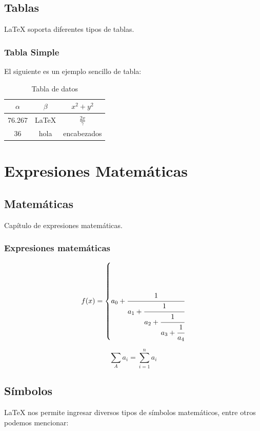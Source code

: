 \documentclass[letterpaper,12pt,twoside]{book}
\begin{document}
\chapter{Tablas}

\LaTeX{} soporta diferentes tipos de tablas.

\section{Tabla Simple}

El siguiente es un ejemplo sencillo de tabla:

\begin{table}[h!]
	\centering
	\begin{tabular}{|c|c|c|}
		\hline 
		$\alpha$ & $\beta$ & $x^2+y^2$ \\ 
		\hline 
		76.267 & \LaTeX & $\frac{2x}{\gamma}$ \\ 
		\hline 
		36 & hola & encabezados \\ 
		\hline 
	\end{tabular} 
	\caption{Tabla de datos}
\end{table}

\part{Expresiones Matemáticas}

\chapter{Matemáticas}

Capítulo de expresiones matemáticas.

\section{Expresiones matemáticas}

\[ f(x) = \left\{ a_0 + \cfrac{1}{a_1 + \cfrac{1}{a_2 + \cfrac{1}{a_3 + \cfrac{1}{a_4} } } } \right. \]

$$\sum_{A} a_i = \sum_{i=1}^n a_i $$

\appendix

\chapter{Símbolos}
\setcounter{page}{1}

\LaTeX{} nos permite ingresar diversos tipos de símbolos matemáticos, entre otros podemos mencionar:
\end{document}
